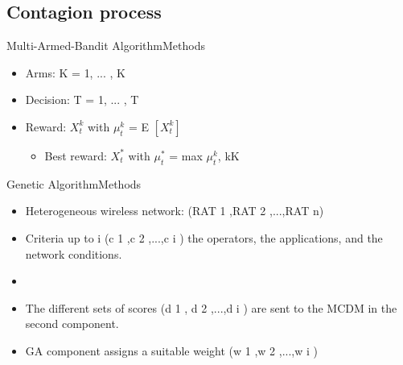 \subsection{Contagion process}

\begin{frame}{Multi-Armed-Bandit Algorithm}{Methods}


\begin{itemize}
	\item Arms: K = {1, ... , K}
	\item Decision: T = {1, ... , T}
	\item Reward: $X^{k}_{t}$ with $\mu^{k}_{t}$ = E $[X^{k}_{t}]$
	\begin{itemize}
		\item Best reward: $X^{*}_{t}$ with $\mu^{*}_{t}$ = max $\mu^{k}_{t}$,  k\in  K
	\end{itemize}


\end{itemize}


\end{frame}


\begin{frame}{Genetic Algorithm}{Methods \cite{alkhawlani_access_2008a}}

\begin{itemize}
	\item Heterogeneous wireless network: (RAT 1 ,RAT 2 ,...,RAT n)
	\item Criteria up to i (c 1 ,c 2 ,...,c i ) the operators, the applications, and the network conditions.
	\item 
	\item The different sets of scores (d 1 , d 2 ,...,d i ) are sent to the MCDM in the second component.
	\item GA component assigns a suitable weight (w 1 ,w 2 ,...,w i )
\end{itemize}

\end{frame}



